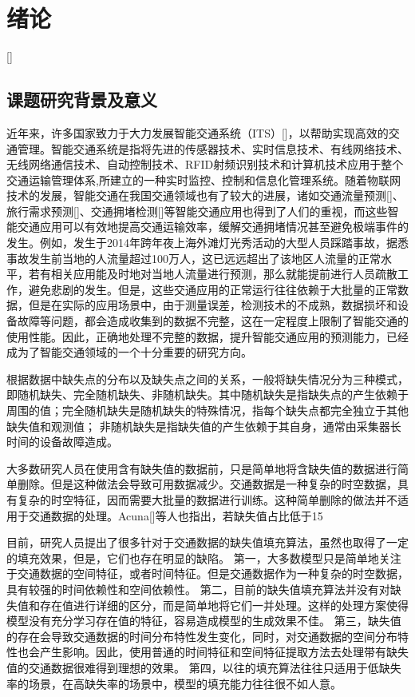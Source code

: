 
\chapter[绪论]{绪论}[]
\section{课题研究背景及意义} 
近年来，许多国家致力于大力发展智能交通系统（ITS）[]，以帮助实现高效的交通管理。智能交通系统是指将先进的传感器技术、实时信息技术、有线网络技术、无线网络通信技术、自动控制技术、RFID射频识别技术和计算机技术应用于整个交通运输管理体系,所建立的一种实时监控、控制和信息化管理系统。随着物联网技术的发展，智能交通在我国交通领域也有了较大的进展，诸如交通流量预测[]、旅行需求预测[]、交通拥堵检测[]等智能交通应用也得到了人们的重视，而这些智能交通应用可以有效地提高交通运输效率，缓解交通拥堵情况甚至避免极端事件的发生。例如，发生于2014年跨年夜上海外滩灯光秀活动的大型人员踩踏事故，据悉事故发生前当地的人流量超过100万人，这已远远超出了该地区人流量的正常水平，若有相关应用能及时地对当地人流量进行预测，那么就能提前进行人员疏散工作，避免悲剧的发生。但是，这些交通应用的正常运行往往依赖于大批量的正常数据，但是在实际的应用场景中，由于测量误差，检测技术的不成熟，数据损坏和设备故障等问题，都会造成收集到的数据不完整，这在一定程度上限制了智能交通的使用性能。因此，正确地处理不完整的数据，提升智能交通应用的预测能力，已经成为了智能交通领域的一个十分重要的研究方向。

根据数据中缺失点的分布以及缺失点之间的关系，一般将缺失情况分为三种模式\cite{little2019statistical}，即随机缺失、完全随机缺失、非随机缺失。其中随机缺失是指缺失点的产生依赖于周围的值；完全随机缺失是随机缺失的特殊情况，指每个缺失点都完全独立于其他缺失值和观测值； 非随机缺失是指缺失值的产生依赖于其自身，通常由采集器长时间的设备故障造成。

大多数研究人员在使用含有缺失值的数据前，只是简单地将含缺失值的数据进行简单删除。但是这种做法会导致可用数据减少。交通数据是一种复杂的时空数据，具有复杂的时空特征，因而需要大批量的数据进行训练。这种简单删除的做法并不适用于交通数据的处理。Acuna[]等人也指出，若缺失值占比低于15%

目前，研究人员提出了很多针对于交通数据的缺失值填充算法，虽然也取得了一定的填充效果，但是，它们也存在明显的缺陷。
第一，大多数模型只是简单地关注于交通数据的空间特征，或者时间特征。但是交通数据作为一种复杂的时空数据，具有较强的时间依赖性和空间依赖性。
第二，目前的缺失值填充算法并没有对缺失值和存在值进行详细的区分，而是简单地将它们一并处理。这样的处理方案使得模型没有充分学习存在值的特征，容易造成模型的生成效果不佳。
第三，缺失值的存在会导致交通数据的时间分布特性发生变化，同时，对交通数据的空间分布特性也会产生影响。因此，使用普通的时间特征和空间特征提取方法去处理带有缺失值的交通数据很难得到理想的效果。
第四，以往的填充算法往往只适用于低缺失率的场景，在高缺失率的场景中，模型的填充能力往往很不如人意。

